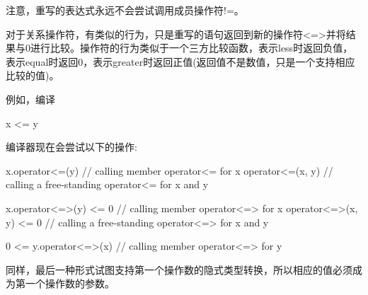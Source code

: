 注意，重写的表达式永远不会尝试调用成员操作符!=。


对于关系操作符，有类似的行为，只是重写的语句返回到新的操作符<=>并将结果与0进行比较。操作符的行为类似于一个三方比较函数，表示less时返回负值，表示equal时返回0，表示greater时返回正值(返回值不是数值，只是一个支持相应比较的值)。

例如，编译

\begin{cpp}
x <= y
\end{cpp}

编译器现在会尝试以下的操作:

\begin{cpp}
x.operator<=(y) // calling member operator<= for x
operator<=(x, y) // calling a free-standing operator<= for x and y

x.operator<=>(y) <= 0 // calling member operator<=> for x
operator<=>(x, y) <= 0 // calling a free-standing operator<=> for x and y

0 <= y.operator<=>(x) // calling member operator<=> for y
\end{cpp}

同样，最后一种形式试图支持第一个操作数的隐式类型转换，所以相应的值必须成为第一个操作数的参数。






